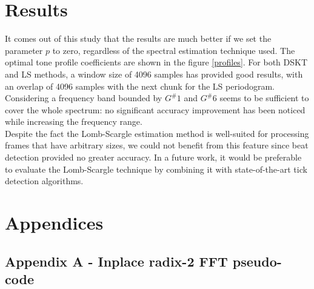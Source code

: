 \documentclass[letterpaper]{article}
\begin{document}
\section{Results}

It comes out of this study that the results are much better if we set the parameter $p$ to zero, regardless of the spectral estimation technique used.
The optimal tone profile coefficients are shown in the figure \ref{profiles}. For both DSKT and LS methods, a window size of 4096 samples has provided good results, with an overlap of 4096 samples with the next chunk for the LS periodogram.
Considering a frequency band bounded by $G^{\#}1$ and $G^{\#}6$ seems to be sufficient to cover the whole spectrum: no significant accuracy improvement has been noticed while increasing the frequency range.\\

Despite the fact the Lomb-Scargle estimation method is well-suited for processing frames that have arbitrary sizes, we could not benefit from this feature since beat detection provided no greater accuracy. In a future work, it would be preferable to evaluate the Lomb-Scargle technique by combining it with state-of-the-art tick detection algorithms.

\begin{table}
\vskip 0.25cm
\caption{Accuracy assessment, according to the raw accuracy and the MIREX index}
\end{table}

\footnotesize



\newpage

\section{Appendices}

\subsection{Appendix A - Inplace radix-2 FFT pseudo-code}
\end{document}
